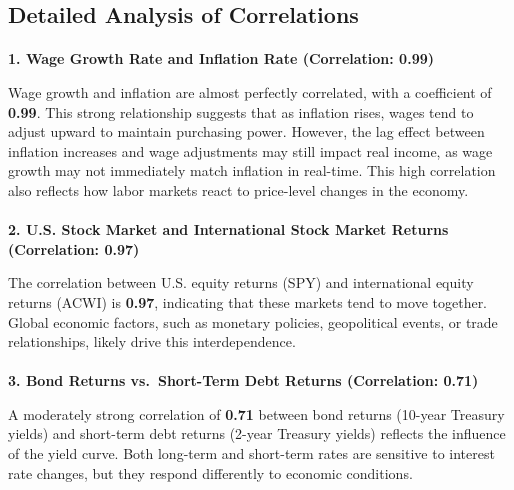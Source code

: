 \documentclass[
  letterpaper,
  DIV=11,
  numbers=noendperiod]{scrartcl}
\makeatletter
\let\oldparagraph\paragraph
\renewcommand{\paragraph}{
    \@ifstar
      \xxxParagraphStar
      \xxxParagraphNoStar
  }
\newcommand{\xxxParagraphStar}[1]{\oldparagraph*{#1}\mbox{}}
\newcommand{\xxxParagraphNoStar}[1]{\oldparagraph{#1}\mbox{}}
\makeatother
\begin{document}
\subsection{Detailed Analysis of
Correlations}\label{detailed-analysis-of-correlations}

\paragraph{\texorpdfstring{\textbf{1. Wage Growth Rate and Inflation
Rate (Correlation:
0.99)}}{1. Wage Growth Rate and Inflation Rate (Correlation: 0.99)}}\label{wage-growth-rate-and-inflation-rate-correlation-0.99}

Wage growth and inflation are almost perfectly correlated, with a
coefficient of \textbf{0.99}. This strong relationship suggests that as
inflation rises, wages tend to adjust upward to maintain purchasing
power. However, the lag effect between inflation increases and wage
adjustments may still impact real income, as wage growth may not
immediately match inflation in real-time. This high correlation also
reflects how labor markets react to price-level changes in the economy.

\paragraph{\texorpdfstring{\textbf{2. U.S. Stock Market and
International Stock Market Returns (Correlation:
0.97)}}{2. U.S. Stock Market and International Stock Market Returns (Correlation: 0.97)}}\label{u.s.-stock-market-and-international-stock-market-returns-correlation-0.97}

The correlation between U.S. equity returns (SPY) and international
equity returns (ACWI) is \textbf{0.97}, indicating that these markets
tend to move together. Global economic factors, such as monetary
policies, geopolitical events, or trade relationships, likely drive this
interdependence.

\paragraph{\texorpdfstring{\textbf{3. Bond Returns vs.~Short-Term Debt
Returns (Correlation:
0.71)}}{3. Bond Returns vs.~Short-Term Debt Returns (Correlation: 0.71)}}\label{bond-returns-vs.-short-term-debt-returns-correlation-0.71}

A moderately strong correlation of \textbf{0.71} between bond returns
(10-year Treasury yields) and short-term debt returns (2-year Treasury
yields) reflects the influence of the yield curve. Both long-term and
short-term rates are sensitive to interest rate changes, but they
respond differently to economic conditions.
\end{document}
